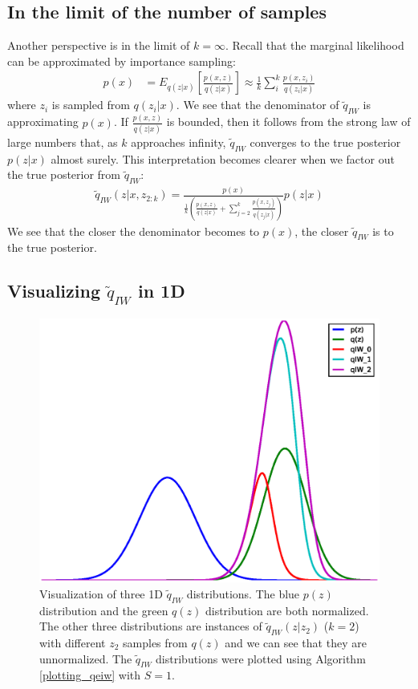 \documentclass{article} %
\begin{document}
\subsection{In the limit of the number of samples}

Another perspective is in the limit of ${k=\infty}$. Recall that the marginal likelihood can be approximated by importance sampling:
\begin{align} 
    p(x) &= E_{q(z|x)}\left[\frac{p(x,z)}{q(z|x)} \right] \approx \frac{1}{k}\sum_i^k \frac{p(x,z_i)}{q(z_i|x)}
\end{align}
where $z_i$ is sampled from $q(z_i|x)$. We see that the denominator of $\tilde{q}_{IW}$ is approximating $p(x)$. If $\frac{p(x,z)}{q(z|x)}$ is bounded, then it follows from the strong law of large numbers that, as $k$ approaches infinity, $\tilde{q}_{IW}$ converges to the true posterior $p(z|x)$ almost surely. This interpretation becomes clearer when we factor out the true posterior from $\tilde{q}_{IW}$:
\begin{align} 
\tilde{q}_{IW}(z|x,z_{2:k}) =  \frac{p(x)}{  \frac{1}{k} \left( \frac{p(x,z)}{q(z|x)}+ \sum_{j=2}^k \frac{p(x,z_j)}{q(z_j|x)} \right) }  p(z|x)
\end{align}
We see that the closer the denominator becomes to $p(x)$, the closer $\tilde{q}_{IW}$ is to the true posterior.








\subsection{Visualizing \texorpdfstring{$\tilde{q}_{IW}$}{} in 1D}
\label{viz_section}

\begin{figure}[H]
  \centering
      \includegraphics[width=.5\textwidth]{figs/figure_1.eps}
  \caption{Visualization of three 1D $\tilde{q}_{IW}$ distributions. The blue $p(z)$ distribution and the green $q(z)$ distribution are both normalized. The other three distributions are instances of $\tilde{q}_{IW}(z|z_2)$ ($k=2$) with different $z_2$ samples from $q(z)$ and we can see that they are unnormalized. The $\tilde{q}_{IW}$ distributions were plotted using Algorithm \ref{plotting_qeiw} with $S=1$.}
  \label{viz}
\end{figure}
\end{document}
